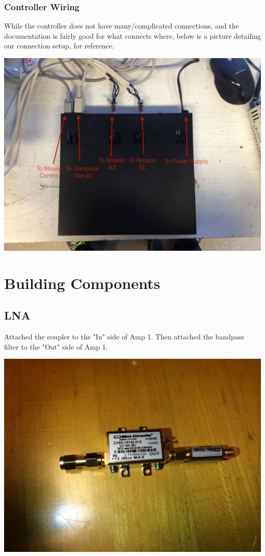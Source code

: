 \documentclass[11pt]{article} %
\begin{document}
\subsubsection{Controller Wiring}

While the controller does not have many/complicated connections, and the documentation is fairly good for what connects where, below is a picture detailing our connection setup, for reference.

\begin{center}
\includegraphics[scale=0.15]{controller/04.jpeg}
\end{center}


\newpage
\section{Building Components}


\subsection{LNA}

Attached the coupler to the "In" side of Amp 1.
Then attached the bandpass filter to the "Out" side of Amp 1. 

\begin{center}
\includegraphics[scale=0.12]{lna/01.jpeg}
\end{center}
\end{document}
